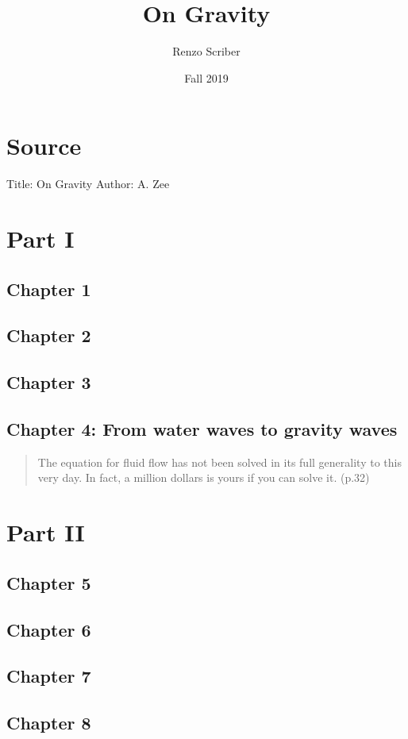 \documentclass[a4paper]{article}
\title{On Gravity}
\author{Renzo Scriber}
\date{Fall 2019}
\begin{document}
\maketitle

\section*{Source}
Title: On Gravity
Author: A. Zee
\section*{Part I}
    \subsection*{Chapter 1}
    \subsection*{Chapter 2}
    \subsection*{Chapter 3}
    \subsection*{Chapter 4: From water waves to gravity waves}
        \begin{quote}
            The equation for fluid flow has not been solved in its full generality to this very day. In fact, a million dollars is yours if you can solve it. (p.32)
        \end{quote}
\section*{Part II}
    \subsection*{Chapter 5}
    \subsection*{Chapter 6}
    \subsection*{Chapter 7}
    \subsection*{Chapter 8}
\end{document}
